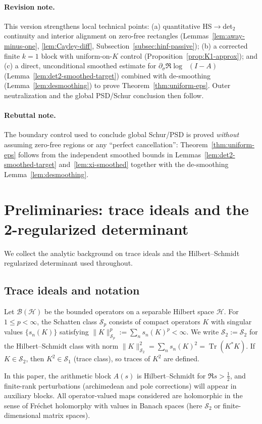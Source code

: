 \documentclass[11pt]{article}
\theoremstyle{remark}
\newcommand{\HS}{\mathcal{S}_2}
\DeclareMathOperator{\Tr}{Tr}
\DeclareMathOperator{\dettwo}{det_2}
\begin{document}
\paragraph{Revision note.} This version strengthens local technical points: (a) quantitative HS$\to$det$_2$ continuity and interior alignment on zero-free rectangles (Lemmas~\ref{lem:away-minus-one}, \ref{lem:Cayley-diff}, Subsection~\ref{subsec:hinf-passive}); (b) a corrected finite $k{=}1$ block with uniform-on-$K$ control (Proposition~\ref{prop:K1-approx}); and (c) a direct, unconditional smoothed estimate for $\partial_\sigma\Re\log\dettwo(I-A)$ (Lemma~\ref{lem:det2-smoothed-target}) combined with de-smoothing (Lemma~\ref{lem:desmoothing}) to prove Theorem~\ref{thm:uniform-eps}. Outer neutralization and the global PSD/Schur conclusion then follow.

\paragraph{Rebuttal note.} The boundary control used to conclude global Schur/PSD is proved \emph{without} assuming zero-free regions or any “perfect cancellation”: Theorem~\ref{thm:uniform-eps} follows from the independent smoothed bounds in Lemmas~\ref{lem:det2-smoothed-target} and~\ref{lem:xi-smoothed} together with the de-smoothing Lemma~\ref{lem:desmoothing}.

\section{Preliminaries: trace ideals and the 2-regularized determinant}
We collect the analytic background on trace ideals and the Hilbert--Schmidt regularized determinant used throughout.

\subsection{Trace ideals and notation}
Let \(\mathcal{B}(\mathcal{H})\) be the bounded operators on a separable Hilbert space \(\mathcal{H}\). For \(1\le p<\infty\), the Schatten class \(\mathcal{S}_p\) consists of compact operators \(K\) with singular values \(\{s_n(K)\}\) satisfying \(\|K\|_{\mathcal{S}_p}^p:=\sum_n s_n(K)^p<\infty\). We write \(\HS:=\mathcal{S}_2\) for the Hilbert--Schmidt class with norm \(\|K\|_{\HS}^2=\sum_n s_n(K)^2=\Tr(K^*K)\). If \(K\in\HS\), then \(K^2\in \mathcal{S}_1\) (trace class), so traces of \(K^2\) are defined.

In this paper, the arithmetic block \(A(s)\) is Hilbert--Schmidt for \(\Re s>\tfrac12\), and finite-rank perturbations (archimedean and pole corrections) will appear in auxiliary blocks. All operator-valued maps considered are holomorphic in the sense of Fr\'echet holomorphy with values in Banach spaces (here \(\HS\) or finite-dimensional matrix spaces).
\end{document}
